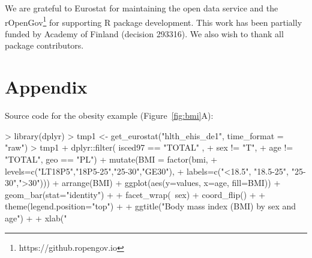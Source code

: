 We are grateful to Eurostat for maintaining the open data service and
the rOpenGov\footnote{https://github.ropengov.io} for supporting R
package development. This work has been partially funded by Academy of
Finland (decision 293316). We also wish to thank all package
contributors.




\address{Leo Lahti\\
  Department of Mathematics and Statistics\\
  PO Box 20014 University of Turku\\
  Finland\\}

\address{Janne Huovari\\
  Pellervo Economic Research PTT\\
  Eerikinkatu 28 A 00180 Helsinki\\
  Finland\\}

\address{Markus Kainu\\
  Research Department, The Social Insurance Institution of Finland\\
  PO Box 450, 00101 Helsinki\\
  Finland\\}

\address{Przemyslaw Biecek\\
  Faculty of Mathematics, Informatics, and Mechanics\\
  University of Warsaw\\
  Banacha 2, 02-097 Warsaw\\
  Poland\\}

\newpage

\section{Appendix}

Source code for the obesity example (Figure~\ref{fig:bmi}A):

\begin{example}
> library(dplyr)
> tmp1 <- get_eurostat("hlth_ehis_de1", time_format = "raw")
> tmp1 %
+  dplyr::filter( isced97 == "TOTAL" ,
+          sex != "T",
+          age != "TOTAL", geo == "PL") %
+  mutate(BMI = factor(bmi, 
+                      levels=c("LT18P5","18P5-25","25-30","GE30"), 
+                      labels=c("<18.5", "18.5-25", "25-30",">30"))) %
+  arrange(BMI) %
+  ggplot(aes(y=values, x=age, fill=BMI)) + geom_bar(stat="identity") +
+  facet_wrap(~sex) + coord_flip() +
+  theme(legend.position="top") +
+  ggtitle("Body mass index (BMI) by sex and age") +
+  xlab("%
\end{example}


